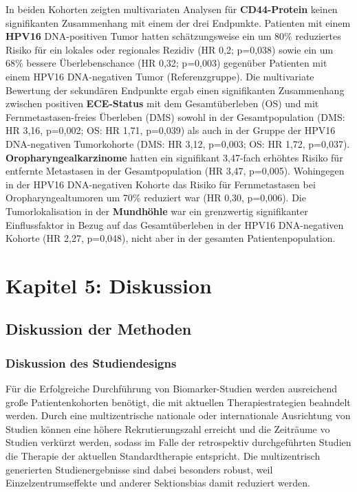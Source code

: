 In beiden Kohorten zeigten multivariaten Analysen für \textbf{CD44-Protein} keinen signifikanten Zusammenhang mit einem der drei Endpunkte. Patienten mit einem \textbf{HPV16} DNA-positiven Tumor hatten schätzungsweise ein um 80\% reduziertes Risiko für ein lokales oder regionales Rezidiv (HR 0,2; p=0,038) sowie ein um 68\% bessere Überlebenschance (HR 0,32; p=0,003) gegenüber Patienten mit einem HPV16 DNA-negativen Tumor (Referenzgruppe). Die multivariate Bewertung der sekundären Endpunkte ergab einen signifikanten Zusammenhang zwischen positiven \textbf{ECE-Status} mit dem Gesamtüberleben (OS) und mit Fernmetastasen-freies Überleben (DMS) sowohl in der Gesamtpopulation (DMS: HR 3,16, p=0,002; OS: HR 1,71, p=0,039) als auch in der Gruppe der HPV16 DNA-negativen Tumorkohorte (DMS: HR 3,12, p=0,003; OS: HR 1,72, p=0,037). \textbf{Oropharyngealkarzinome} hatten ein signifikant 3,47-fach erhöhtes Risiko für entfernte Metastasen in der Gesamtpopulation (HR 3,47, p=0,005). Wohingegen in der HPV16 DNA-negativen Kohorte das Risiko für Fernmetastasen bei Oropharyngealtumoren um 70\% reduziert war (HR 0,30, p=0,006). Die Tumorlokalisation in der \textbf{Mundhöhle} war ein grenzwertig signifikanter Einflussfaktor in Bezug auf das Gesamtüberleben in der HPV16 DNA-negativen Kohorte (HR 2,27, p=0,048), nicht aber in der gesamten Patientenpopulation.

\hypertarget{kapitel-5-diskussion}{%
\section{Kapitel 5: Diskussion}\label{kapitel-5-diskussion}}

\hypertarget{diskussion-der-methoden}{%
\subsection{Diskussion der Methoden}\label{diskussion-der-methoden}}

\hypertarget{diskussion-des-studiendesigns}{%
\subsubsection{Diskussion des Studiendesigns}\label{diskussion-des-studiendesigns}}

Für die Erfolgreiche Durchführung von Biomarker-Studien werden ausreichend große Patientenkohorten benötigt, die mit aktuellen Therapiestrategien beahndelt werden. Durch eine multizentrische nationale oder internationale Ausrichtung von Studien können eine höhere Rekrutierungszahl erreicht und die Zeiträume vo Studien verkürzt werden, sodass im Falle der retrospektiv durchgeführten Studien die Therapie der aktuellen Standardtherapie entspricht. Die multizentrisch generierten Studienergebnisse sind dabei besonders robust, weil Einzelzentrumseffekte und anderer Sektionsbias damit reduziert werden.


